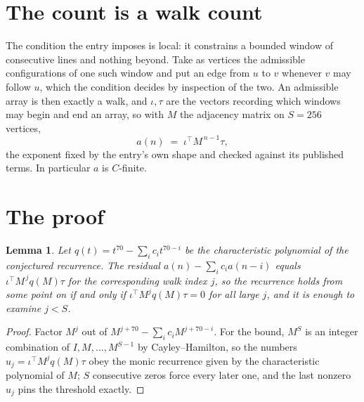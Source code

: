 \documentclass[11pt,a4paper]{article}
\theoremstyle{plain}
\newtheorem{lemma}[theorem]{Lemma}
\theoremstyle{definition}
\begin{document}
\section{The count is a walk count}

The condition the entry imposes is local: it constrains a bounded window of consecutive lines and nothing beyond. Take as vertices the admissible configurations of one such window and put an edge from $u$ to $v$ whenever $v$ may follow $u$, which the condition decides by inspection of the two.
An admissible array is then exactly a walk, and $\iota,\tau$ are the vectors recording which windows may begin and end an array, so with $M$ the adjacency matrix on $S=256$ vertices,
\[
a(n)\;=\;\iota^{\!\top}M^{\,n-1}\tau ,
\]
the exponent fixed by the entry's own shape and checked against its published terms. In
particular $a$ is $C$-finite.

\section{The proof}

\begin{lemma}\label{lem:crit}
Let $q(t)=t^{70}-\sum_i c_it^{70-i}$ be the characteristic polynomial of the
conjectured recurrence. The residual $a(n)-\sum_ic_ia(n-i)$ equals
$\iota^{\!\top}M^{\,j}q(M)\tau$ for the corresponding walk index $j$, so the recurrence
holds from some point on if and only if $\iota^{\!\top}M^{j}q(M)\tau=0$ for all large $j$,
and it is enough to examine $j<S$.
\end{lemma}

\begin{proof}
Factor $M^{j}$ out of $M^{j+70}-\sum_ic_iM^{j+70-i}$. For the bound, $M^{S}$
is an integer combination of $I,M,\dots,M^{S-1}$ by Cayley--Hamilton, so the numbers
$u_j=\iota^{\!\top}M^{j}q(M)\tau$ obey the monic recurrence given by the characteristic
polynomial of $M$; $S$ consecutive zeros force every later one, and the last nonzero $u_j$
pins the threshold exactly.
\end{proof}
\end{document}
